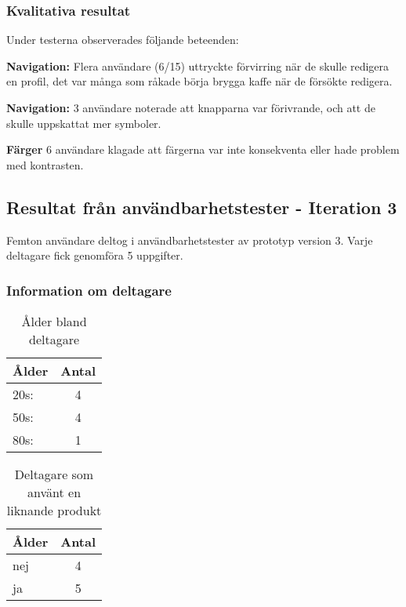 \subsubsection{Kvalitativa resultat}

Under testerna observerades följande beteenden:

\textbf{Navigation:} Flera användare (6/15) uttryckte förvirring när de skulle redigera en profil, det var många som råkade börja brygga kaffe när de försökte redigera.

\textbf{Navigation:} 3 användare noterade att knapparna var förivrande, och att de skulle uppskattat mer symboler. 

\textbf{Färger} 6 användare klagade att färgerna var inte konsekventa eller hade problem med kontrasten. 


\subsection{Resultat från användbarhetstester - Iteration 3}

Femton användare deltog i användbarhetstester av prototyp version 3. Varje deltagare fick genomföra 5 uppgifter. 

\subsubsection{Information om deltagare}

\begin{table}[H]
\centering
\begin{tabular}{|l|c|}
\hline
\textbf{Ålder} & \textbf{Antal} \\
\hline
20s:  & 4  \\ 
50s:  & 4  \\
80s:  & 1  \\
\hline
\end{tabular}
\caption{Ålder bland deltagare}
\label{tab:age2}
\end{table}

\begin{table}[H]
\centering
\begin{tabular}{|l|c|}
\hline
\textbf{Ålder} & \textbf{Antal} \\
\hline
nej  & 4   \\
ja  & 5  \\
\hline
\end{tabular}
\caption{Deltagare som använt en liknande produkt}
\label{tab:exp2}
\end{table}

